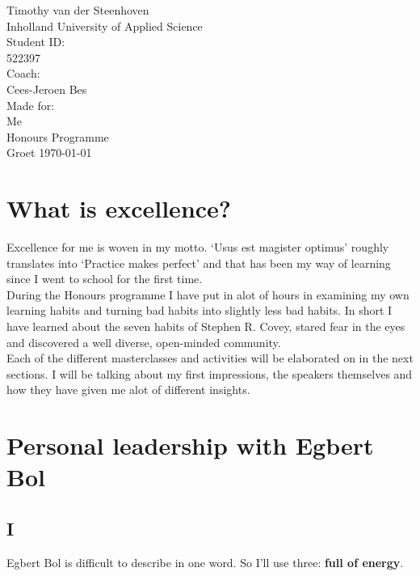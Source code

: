 \documentclass{article}
\begin{document}
\begin{titlepage}
\begin{center}
    
    {\Large Timothy van der Steenhoven}\\
    {\large Inholland University of Applied Science}
    \\[.5cm]
    Student ID:\\ 522397 
    \\[2cm]
    Coach:\\
    Cees-Jeroen Bes
    \\[2cm]
    Made for:\\
    Me\\
    Honours Programme
    \\[1cm]
    {\large Groet \today}
\end{center}
\end{titlepage}

\newpage

\tableofcontents

\newpage

\section*{What is excellence?}
Excellence for me is woven in my motto. `Usus est magister optimus' roughly translates into `Practice makes perfect' and that has been my way of learning since I went to school for the first time. \\

During the Honours programme I have put in alot of hours in examining my own learning habits and turning bad habits into slightly less bad habits. In short I have learned about the seven habits of Stephen R. Covey, stared fear in the eyes and discovered a well diverse, open-minded community.\\

Each of the different masterclasses and activities will be elaborated on in the next sections. I will be talking about my first impressions, the speakers themselves and how they have given me alot of different insights. \\

\section{Personal leadership with Egbert Bol}
\subsection{I}
Egbert Bol is difficult to describe in one word. So I'll use three: \textbf{full of energy}.\\
\end{document}
